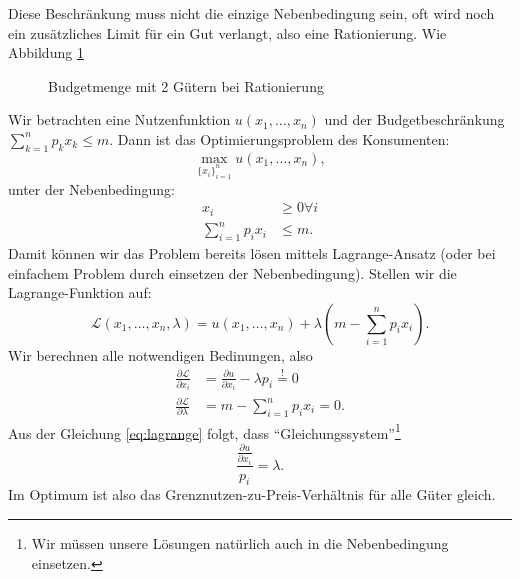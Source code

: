 \begin{remark}
	Diese Beschränkung muss nicht die einzige Nebenbedingung sein, oft wird noch ein zusätzliches Limit für ein Gut verlangt, also eine Rationierung. Wie Abbildung \ref{fig:budgetmenge-rationierung}
	\begin{figure}[h]
		\label{fig:budgetmenge-rationierung}
		\centering
		\caption{Budgetmenge mit 2 Gütern bei Rationierung}
	\end{figure}
\end{remark}

\begin{construction}[Maximierungsproblem] \label{maximierungsproblem} Wir betrachten eine Nutzenfunktion $u(x_1,\dotsc,x_n)$ und der Budgetbeschränkung $\sum_{k=1}^{n} p_k x_k \le m$. Dann ist das Optimierungsproblem des Konsumenten:
	\[
		\max_{\{x_i\}_{i=1}^{n}} u(x_1,\dotsc,x_n)
		,\]
	unter der Nebenbedingung:
	\begin{align*}
		x_i                    & \ge 0 \forall i \\
		\sum_{i=1}^{n} p_i x_i & \le m
		.\end{align*}
	Damit können wir das Problem bereits lösen mittels Lagrange-Ansatz (oder bei einfachem Problem durch einsetzen der Nebenbedingung). Stellen wir die Lagrange-Funktion auf:
	\[
		\mathcal{L}(x_1,\dotsc,x_n, \lambda) = u(x_1,\dotsc,x_n) + \lambda \left(m- \sum_{i=1}^{n} p_i x_i \right)
		.\]
	Wir berechnen alle notwendigen Bedinungen, also
	\begin{align}
		\frac{\partial \mathcal{L}}{\partial x_i}     & = \frac{\partial u}{\partial x_i} - \lambda p_i \overset{!}{=} 0 \label{eq:lagrange} \\
		\frac{\partial \mathcal{L}}{\partial \lambda} & =  m - \sum_{i=1}^{n} p_i x_i = 0
		.\end{align}
	Aus der Gleichung \eqref{eq:lagrange} folgt, dass \enquote{Gleichungssystem}\footnote{Wir müssen unsere Lösungen natürlich auch in die Nebenbedingung einsetzen.}
	\[
		\frac{\frac{\partial u}{\partial x_i}}{p_i} = \lambda
		.\]
	Im Optimum ist also das Grenznutzen-zu-Preis-Verhältnis für alle Güter gleich.
\end{construction}

